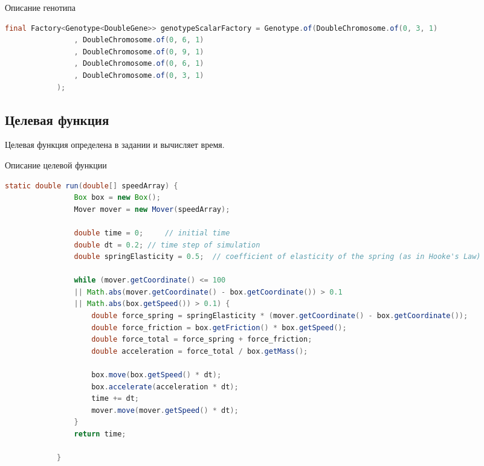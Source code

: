 		\begin{ListingEnv}[H]%
			\caption{Описание генотипа}
			\label{list:hwbeauty}
			\begin{lstlisting}[language={Java}]
			final Factory<Genotype<DoubleGene>> genotypeScalarFactory = Genotype.of(DoubleChromosome.of(0, 3, 1)
				, DoubleChromosome.of(0, 6, 1)
				, DoubleChromosome.of(0, 9, 1)
				, DoubleChromosome.of(0, 6, 1)
				, DoubleChromosome.of(0, 3, 1)
			);
			\end{lstlisting}
		\end{ListingEnv}%
	
	\subsection{Целевая функция}
		Целевая функция определена в задании и вычисляет время. 
		\begin{ListingEnv}[H]
		\caption{Описание целевой функции}
			\begin{lstlisting}[language={Java}]
			static double run(double[] speedArray) {
				Box box = new Box();
				Mover mover = new Mover(speedArray);
				
				double time = 0;     // initial time
				double dt = 0.2; // time step of simulation
				double springElasticity = 0.5;  // coefficient of elasticity of the spring (as in Hooke's Law)
				
				while (mover.getCoordinate() <= 100
				|| Math.abs(mover.getCoordinate() - box.getCoordinate()) > 0.1
				|| Math.abs(box.getSpeed()) > 0.1) {
					double force_spring = springElasticity * (mover.getCoordinate() - box.getCoordinate());
					double force_friction = box.getFriction() * box.getSpeed();
					double force_total = force_spring + force_friction;
					double acceleration = force_total / box.getMass();
					
					box.move(box.getSpeed() * dt);
					box.accelerate(acceleration * dt);
					time += dt;
					mover.move(mover.getSpeed() * dt);
				}
				return time;
				
			}
			\end{lstlisting}
		\end{ListingEnv}%
		
